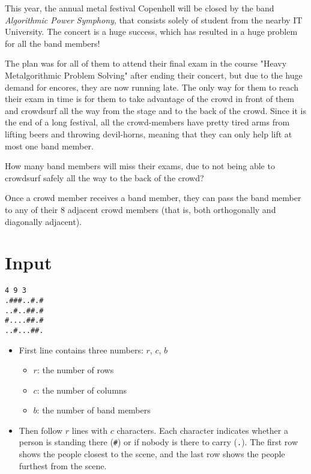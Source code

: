 

This year, the annual metal festival Copenhell will be closed by the band \textit{Algorithmic Power Symphony}, that consists solely of student from the nearby IT University. The concert is a huge success, which has resulted in a huge problem for all the band members!

The plan was for all of them to attend their final exam in the course "Heavy Metalgorithmic Problem Solving" after ending their concert, but due to the huge demand for encores, they are now running late. The only way for them to reach their exam in time is for them to take advantage of the crowd in front of them and crowdsurf all the way from the stage and to the back of the crowd. Since it is the end of a long festival, all the crowd-members have pretty tired arms from lifting beers and throwing devil-horns, meaning that they can only help lift at most one band member.

How many band members will miss their exams, due to not being able to crowdsurf safely all the way to the back of the crowd?

Once a crowd member receives a band member, they can pass the band member to any of their 8 adjacent crowd members (that is, both orthogonally and diagonally adjacent).

\section*{Input}

\begin{verbatim}
4 9 3
.###..#.#
..#..##.#
#....##.#
..#...##.
\end{verbatim}

\begin{itemize}
  \item First line contains three numbers: $r$, $c$, $b$
    \begin{itemize}
      \item $r$: the number of rows
      \item $c$: the number of columns
      \item $b$: the number of band members
    \end{itemize}
  \item Then follow $r$ lines with $c$ characters. Each character indicates whether a person is standing there (\texttt{\#}) or if nobody is there to carry (\texttt{.}). The first row shows the people closest to the scene, and the last row shows the people furthest from the scene.
\end{itemize}

